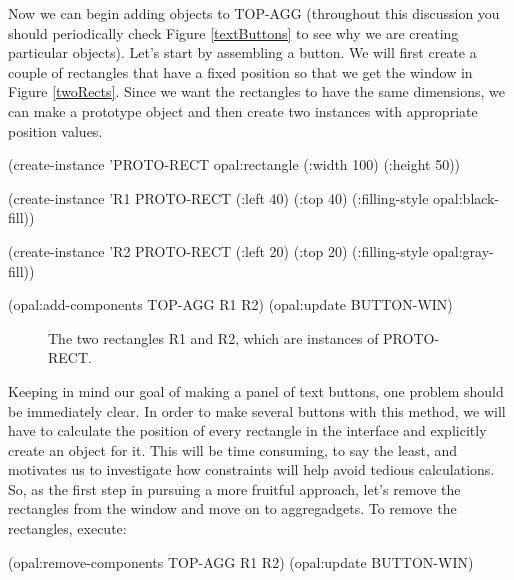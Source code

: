 Now we can begin adding objects to TOP-AGG (throughout this discussion
you should periodically check Figure \ref{textButtons} to see why we
are creating particular objects).  Let's start by assembling a button.
We will first create a couple of rectangles that have a fixed position
so that we get the window in Figure \ref{twoRects}.  Since we
want the rectangles to have the same dimensions, we can make a
prototype object and then create two instances with appropriate
position values.

\begin{programexample}
(create-instance 'PROTO-RECT opal:rectangle
   (:width 100) (:height 50))

(create-instance 'R1 PROTO-RECT
   (:left 40) (:top 40)
   (:filling-style opal:black-fill))

(create-instance 'R2 PROTO-RECT
    (:left 20) (:top 20)
    (:filling-style opal:gray-fill))

(opal:add-components TOP-AGG R1 R2)
(opal:update BUTTON-WIN)
\end{programexample}

\begin{figure}
\begin{center}
\begin{makeimage}
\end{makeimage}
\begin{latexonly}
\end{latexonly}
\end{center}
\caption{The two rectangles R1 and R2, which are instances of PROTO-RECT.}
\end{figure}

Keeping in mind our goal of making a panel of text buttons, one
problem should be immediately clear.  In order to make several
buttons with this method, we will have to calculate the position of
every rectangle in the interface and explicitly create an object for
it.  This will be time consuming, to say the least, and motivates us
to investigate how constraints will help avoid tedious calculations.
So, as the first step in pursuing a more fruitful approach, let's
remove the rectangles from the window and move on to aggregadgets.
To remove the rectangles, execute:

\begin{programexample}
(opal:remove-components TOP-AGG R1 R2)
(opal:update BUTTON-WIN)
\end{programexample}


